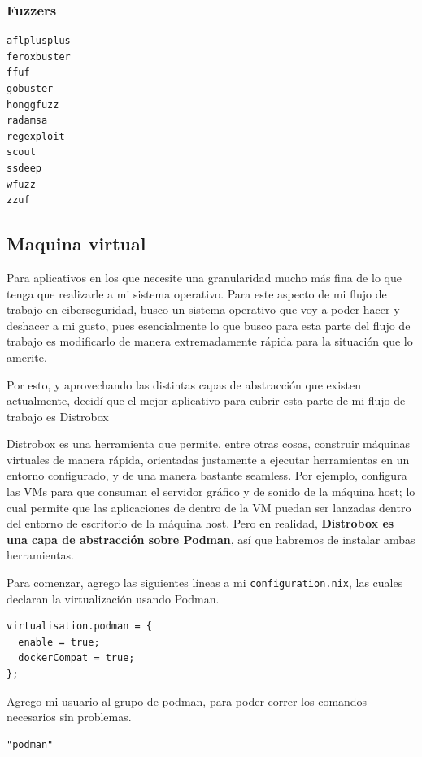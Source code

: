 \documentclass[11pt]{article}
\begin{document}
\subsubsection{Fuzzers}
\label{sec:org249abc2}

\begin{verbatim}
aflplusplus
feroxbuster
ffuf
gobuster
honggfuzz
radamsa
regexploit
scout
ssdeep
wfuzz
zzuf
\end{verbatim}
\subsection{Maquina virtual}
\label{sec:org6d8f35d}

Para aplicativos en los que necesite una granularidad mucho más fina de lo que tenga que realizarle a mi sistema operativo. Para este aspecto de mi flujo de trabajo en ciberseguridad, busco un sistema operativo que voy a poder hacer y deshacer a mi gusto, pues esencialmente lo que busco para esta parte del flujo de trabajo es modificarlo de manera extremadamente rápida para la situación que lo amerite.

Por esto, y aprovechando las distintas capas de abstracción que existen actualmente, decidí que el mejor aplicativo para cubrir esta parte de mi flujo de trabajo es Distrobox

Distrobox es una herramienta que permite, entre otras cosas, construir máquinas virtuales de manera rápida, orientadas justamente a ejecutar herramientas en un entorno configurado, y de una manera bastante seamless. Por ejemplo, configura las VMs para que consuman el servidor gráfico y de sonido de la máquina host; lo cual permite que las aplicaciones de dentro de la VM puedan ser lanzadas dentro del entorno de escritorio de la máquina host. Pero en realidad, \textbf{Distrobox es una capa de abstracción sobre Podman}, así que habremos de instalar ambas herramientas.

Para comenzar, agrego las siguientes líneas a mi \texttt{configuration.nix}, las cuales declaran la virtualización usando Podman.

\begin{verbatim}
virtualisation.podman = {
  enable = true;
  dockerCompat = true;
};
\end{verbatim}

Agrego mi usuario al grupo de podman, para poder correr los comandos necesarios sin problemas.

\begin{verbatim}
"podman"
\end{verbatim}
\end{document}

